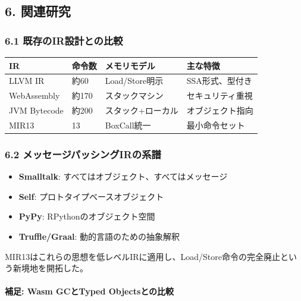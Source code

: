 \documentclass[
]{article}
\providecommand{\tightlist}{%
  \setlength{\itemsep}{0pt}\setlength{\parskip}{0pt}}
\begin{document}
\hypertarget{ux95a2ux9023ux7814ux7a76}{%
\subsection{6. 関連研究}\label{ux95a2ux9023ux7814ux7a76}}

\hypertarget{ux65e2ux5b58ux306eirux8a2dux8a08ux3068ux306eux6bd4ux8f03}{%
\subsubsection{6.1
既存のIR設計との比較}\label{ux65e2ux5b58ux306eirux8a2dux8a08ux3068ux306eux6bd4ux8f03}}

\begin{longtable}[]{@{}llll@{}}
\toprule\noalign{}
IR & 命令数 & メモリモデル & 主な特徴 \\
\midrule\noalign{}
\endhead
\bottomrule\noalign{}
\endlastfoot
LLVM IR & 約60 & Load/Store明示 & SSA形式、型付き \\
WebAssembly & 約170 & スタックマシン & セキュリティ重視 \\
JVM Bytecode & 約200 & スタック+ローカル & オブジェクト指向 \\
MIR13 & 13 & BoxCall統一 & 最小命令セット \\
\end{longtable}

\hypertarget{ux30e1ux30c3ux30bbux30fcux30b8ux30d1ux30c3ux30b7ux30f3ux30b0irux306eux7cfbux8b5c}{%
\subsubsection{6.2
メッセージパッシングIRの系譜}\label{ux30e1ux30c3ux30bbux30fcux30b8ux30d1ux30c3ux30b7ux30f3ux30b0irux306eux7cfbux8b5c}}

\begin{itemize}
\tightlist
\item
  \textbf{Smalltalk}: すべてはオブジェクト、すべてはメッセージ
\item
  \textbf{Self}: プロトタイプベースオブジェクト
\item
  \textbf{PyPy}: RPythonのオブジェクト空間
\item
  \textbf{Truffle/Graal}: 動的言語のための抽象解釈
\end{itemize}

MIR13はこれらの思想を低レベルIRに適用し、Load/Store命令の完全廃止という新境地を開拓した。

\hypertarget{ux88dcux8db3-wasm-gcux3068typed-objectsux3068ux306eux6bd4ux8f03}{%
\paragraph{補足: Wasm GCとTyped
Objectsとの比較}\label{ux88dcux8db3-wasm-gcux3068typed-objectsux3068ux306eux6bd4ux8f03}}
\end{document}
